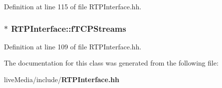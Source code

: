 Definition at line 115 of file R\+T\+P\+Interface.\+hh.

\subsubsection[{f\+T\+C\+P\+Streams}]{$\ast$ R\+T\+P\+Interface\+::f\+T\+C\+P\+Streams\hspace{0.3cm}{\ttfamily [private]}}\label{classRTPInterface_a7fc1c661320206413c05245066f4fd81}


Definition at line 109 of file R\+T\+P\+Interface.\+hh.



The documentation for this class was generated from the following file\+:\begin{DoxyCompactItemize}
\item 
live\+Media/include/{\bf R\+T\+P\+Interface.\+hh}\end{DoxyCompactItemize}
